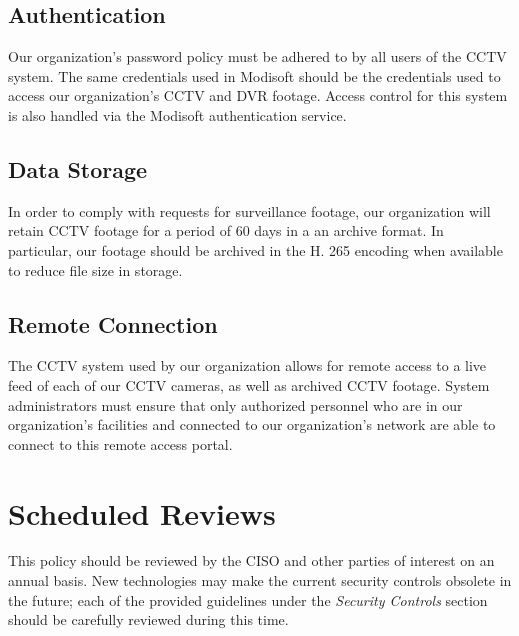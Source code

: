 \documentclass[11pt]{article}
\begin{document}
\subsection{Authentication}
\label{sec:org0e03f69}
Our organization's password policy must be adhered to by all users of the CCTV system. The same credentials used in Modisoft should be the credentials used to access our organization's CCTV and DVR footage. Access control for this system is also handled via the Modisoft authentication service.

\subsection{Data Storage}
\label{sec:orgeb63398}
In order to comply with requests for surveillance footage, our organization will retain CCTV footage for a period of 60 days in a an archive format. In particular, our footage should be archived in the H. 265 encoding when available to reduce file size in storage. 

\subsection{Remote Connection}
\label{sec:org240f0c6}
The CCTV system used by our organization allows for remote access to a live feed of each of our CCTV cameras, as well as archived CCTV footage. System administrators must ensure that only authorized personnel who are in our organization's facilities and connected to our organization's network are able to connect to this remote access portal.

\section{Scheduled Reviews}
\label{sec:orgd45c248}
This policy should be reviewed by the CISO and other parties of interest on an annual basis. New technologies may make the current security controls obsolete in the future; each of the provided guidelines under the \emph{Security Controls} section should be carefully reviewed during this time.
\end{document}
